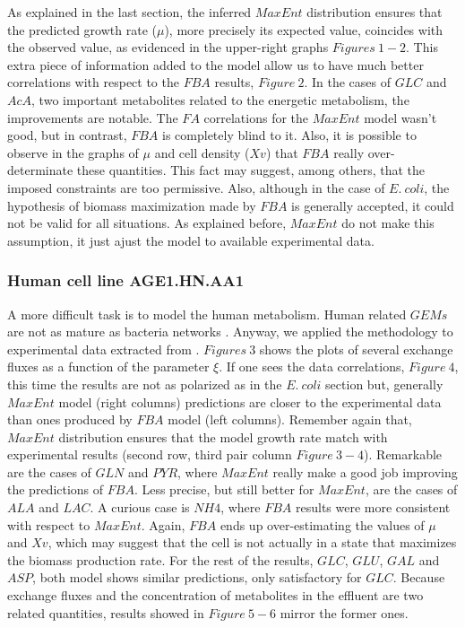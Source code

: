 \documentclass[]{article}
\begin{document}
	As explained in the last section, the inferred $MaxEnt$ distribution ensures that the predicted growth rate ($\mu$), more precisely its expected value, coincides with the observed value, as evidenced in the upper-right graphs $Figures\ 1-2$. 
	This extra piece of information added to the model allow us to have much better correlations with respect to the $FBA$ results, $Figure\ 2$.
	In the cases of $GLC$ and $AcA$, two important metabolites related to the energetic metabolism, the improvements are notable.
	The $FA$ correlations for the $MaxEnt$ model wasn't good, but in contrast, $FBA$ is completely blind to it.
	Also, it is possible to observe in the graphs of $\mu$ and cell density ($Xv$)  that $FBA$ really over-determinate these quantities. 
	This fact may suggest, among others, that the imposed constraints are too permissive. 
	Also, although in the case of $E.\ coli$, the hypothesis of biomass maximization made by $FBA$ is generally accepted, it could not be valid for all situations.
	As explained before, $MaxEnt$ do not make this assumption, it just ajust the model to available experimental data.


	\subsubsection{Human cell line AGE1.HN.AA1}

	A more difficult task is to model the human metabolism. 
	Human related $GEMs$ are not as mature as bacteria networks . 
	Anyway, we applied the methodology to experimental data extracted from . 
	$Figures\ 3$ shows the plots of several exchange fluxes as a function of the parameter $\xi$. 
	If one sees the data correlations, $Figure\ 4$, this time the results are not as polarized as in the $E.\ coli$ section but, generally $MaxEnt$ model (right columns) predictions are closer to the experimental data than ones produced by $FBA$ model (left columns). 
	Remember again that, $MaxEnt$ distribution ensures that the model growth rate match with experimental results (second row, third pair column $Figure\ 3 - 4$).
	Remarkable are the cases of $GLN$ and $PYR$, where $MaxEnt$ really make a good job improving the predictions of $FBA$. 
	Less precise, but still better for $MaxEnt$, are the cases of $ALA$ and $LAC$.  A curious case is $NH4$, where $FBA$ results were more consistent with respect to $MaxEnt$.
	Again, $FBA$ ends up over-estimating the values of $\mu$ and $Xv$, which may suggest that the cell is not actually in a state that maximizes the biomass production rate.
	For the rest of the results, $GLC$, $GLU$, $GAL$ and $ASP$, both model shows similar predictions, only satisfactory for $GLC$. 
	Because exchange fluxes and the concentration of metabolites in the effluent are two related quantities, results showed in $Figure\ 5 - 6$ mirror the former ones.
	
\end{document}
